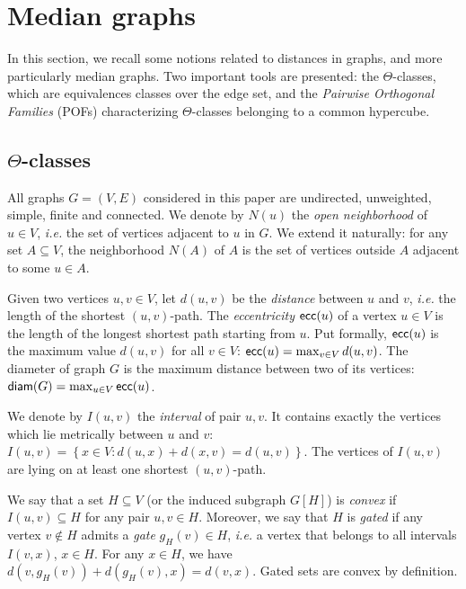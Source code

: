 \documentclass[a4paper,UKenglish,numberwithinsect,cleveref, autoref]{lipics-v2021}
\newcommand{\set}[1]{\left\{ #1 \right\}}
\newcommand{\diam}{\mbox{\textsf{diam}}}
\newcommand{\ecc}{\mbox{\textsf{ecc}}}
\begin{document}
\section{Median graphs} \label{sec:median}

In this section, we recall some notions related to distances in graphs, and more particularly median graphs. Two important tools are presented: the $\Theta$-classes, which are equivalences classes over the edge set, and the \textit{Pairwise Orthogonal Families} (POFs) characterizing $\Theta$-classes belonging to a common hypercube. 

\subsection{$\Theta$-classes} 

All graphs $G = (V,E)$ considered in this paper are undirected, unweighted, simple, finite and connected. We denote by $N(u)$ the \textit{open neighborhood} of $u \in V$, {\em i.e.} the set of vertices adjacent to $u$ in $G$. We extend it naturally: for any set $A \subseteq V$, the neighborhood $N(A)$ of $A$ is the set of vertices outside $A$ adjacent to some $u \in A$.

Given two vertices $u,v \in V$, let $d(u,v)$ be the \textit{distance} between $u$ and $v$, {\em i.e.} the length of the shortest $(u,v)$-path. The \textit{eccentricity} $\ecc(u)$ of a vertex $u \in V$ is the length of the longest shortest path starting from $u$. Put formally, $\ecc(u)$ is the maximum value $d(u,v)$ for all $v \in V$: $\ecc(u) = \max_{v \in V} d(u,v)$. The diameter of graph $G$ is the maximum distance between two of its vertices: $\diam(G) = \max_{u \in V} \ecc(u)$. 

We denote by $I(u,v)$ the \textit{interval} of pair $u,v$. It contains exactly the vertices which lie metrically between $u$ and $v$:
$I(u,v) = \set{x \in V: d(u,x) + d(x,v) = d(u,v)}$. The vertices of $I(u,v)$ are lying on at least one shortest $(u,v)$-path.

We say that a set $H\subseteq V$ (or the induced subgraph $G\left[H\right]$) is \textit{convex} if $I(u,v) \subseteq H$ for any pair $u,v \in H$. Moreover, we say that $H$ is \textit{gated} if any vertex $v \notin H$ admits a \textit{gate} $g_H(v) \in H$, {\em i.e.} a vertex that belongs to all intervals $I(v,x)$, $x\in H$. For any $x \in H$, we have $d(v,g_H(v)) + d(g_H(v),x) = d(v,x)$. Gated sets are convex by definition.
\end{document}
